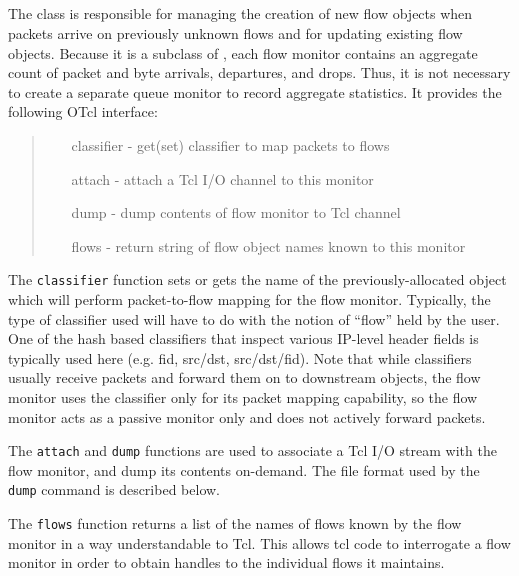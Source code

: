 \subsection{}

The  class is responsible for managing
the creation of new flow objects when packets arrive on previously
unknown flows and for updating existing flow objects.
Because it is a subclass of , each flow monitor
contains an aggregate count of packet and byte arrivals, departures, and
drops.
Thus, it is not necessary to create a separate queue monitor to record
aggregate statistics.
It provides the following OTcl interface:
\begin{quote}
\begin{itemize}
        \item[classifier] - get(set) classifier to map packets to flows
        \item[attach] - attach a Tcl I/O channel to this monitor
        \item[dump] - dump contents of flow monitor to Tcl channel
        \item[flows] - return string of flow object names known to this monitor
\end{itemize}
\end{quote}

The {\tt classifier} function sets or gets the name of the previously-allocated
object which will perform packet-to-flow mapping for the flow monitor.
Typically, the type of classifier used will have to do with the notion of
``flow'' held by the user.
One of the hash based classifiers that inspect various IP-level header
fields is typically used here (e.g. fid, src/dst, src/dst/fid).
Note that while classifiers usually receive packets and forward them
on to downstream objects, the flow monitor uses the classifier only for
its packet mapping capability, so the flow monitor acts as a passive
monitor only and does not actively forward packets.

The {\tt attach} and {\tt dump} functions are used to
associate a Tcl I/O stream with the
flow monitor, and dump its contents on-demand.
The file format used by the {\tt dump} command is described below.

The {\tt flows} function returns a list of the names of flows known
by the flow monitor in a way understandable to Tcl.
This allows tcl code to interrogate a flow monitor in order
to obtain handles to the individual flows it maintains.

